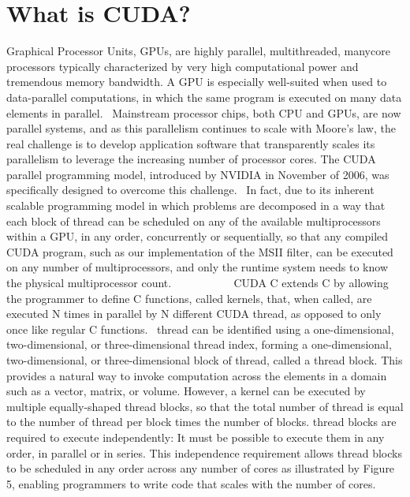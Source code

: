 \documentclass[openany]{book}
\begin{document}
\chapter{What is CUDA?}
Graphical Processor Units, GPUs, are highly parallel, multithreaded, manycore processors typically characterized by very high computational power and tremendous memory bandwidth. A GPU is especially well-suited when used to data-parallel computations, in which the same program is executed on many data elements in parallel.~\cite[p.~1.1]{CUDA18}
Mainstream processor chips, both CPU and GPUs, are now parallel systems, and as this parallelism continues to scale with Moore's law, the real challenge is to develop application software that transparently scales its parallelism to leverage the increasing number of processor cores. The CUDA parallel programming model, introduced by NVIDIA in November of 2006, was specifically designed to overcome this challenge.~\cite[p.~1.3]{CUDA18}
In fact, due to its inherent scalable programming model in which problems are decomposed in a way that each block of thread can be scheduled on any of the available multiprocessors within a GPU, in any order, concurrently or sequentially, so that any compiled CUDA program, such as our implementation of the MSII filter, can be executed on any number of multiprocessors, and only the runtime system needs to know the physical multiprocessor count.~\cite[p.~1.3]{CUDA18}
~~~~~~~~~
CUDA C extends C by allowing the programmer to define C functions, called kernels, that, when called, are executed N times in parallel by N different CUDA thread, as opposed to only once like regular C functions.~\cite[p.~2.1]{CUDA18}
thread can be identified using a one-dimensional, two-dimensional, or three-dimensional thread index, forming a one-dimensional, two-dimensional, or three-dimensional block of thread, called a thread block. This provides a natural way to invoke computation across the elements in a domain such as a vector, matrix, or volume. However, a kernel can be executed by multiple equally-shaped thread blocks, so that the total number of thread is equal to the number of thread per block times the number of blocks. thread blocks are required to execute independently: It must be possible to execute them in any order, in parallel or in series. This independence requirement allows thread blocks to be scheduled in any order across any number of cores as illustrated by Figure 5, enabling programmers to write code that scales with the number of cores.~\cite[p.~2.2]{CUDA18}
\end{document}
